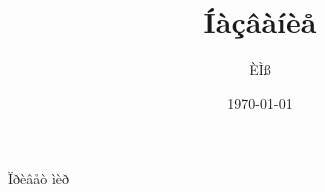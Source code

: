 \documentclass[a4paper, 12pt]{article}
\author{ÈÌß}
\title{Íàçâàíèå}
\date{\today}
\begin{document}
\maketitle

Ïðèâåò ìèð
\end{document}
